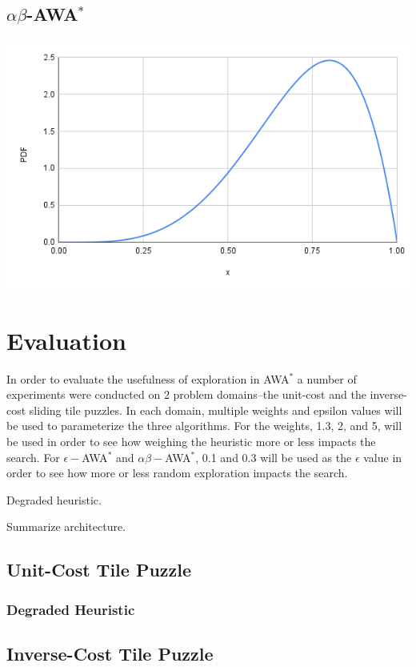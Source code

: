 \documentclass{llncs}
\begin{document}
\subsection{$\alpha \beta$-AWA$^*$}

\noindent
\includegraphics[scale=0.4]{media/chart.png}



\section{Evaluation}
In order to evaluate the usefulness of exploration in AWA$^*$ a number of experiments were conducted on 2 problem domains--the unit-cost and the inverse-cost sliding tile puzzles. In each domain, multiple weights and epsilon values will be used to parameterize the three algorithms. For the weights, 1.3, 2, and 5, will be used in order to see how weighing the heuristic more or less impacts the search. For $\epsilon-$AWA$^*$ and $\alpha \beta-$AWA$^*$, 0.1 and 0.3 will be used as the $\epsilon$ value in order to see how more or less random exploration impacts the search. 

Degraded heuristic.

Summarize architecture.

\subsection{Unit-Cost Tile Puzzle}

\subsubsection{Degraded Heuristic}


\subsection{Inverse-Cost Tile Puzzle}
\end{document}
